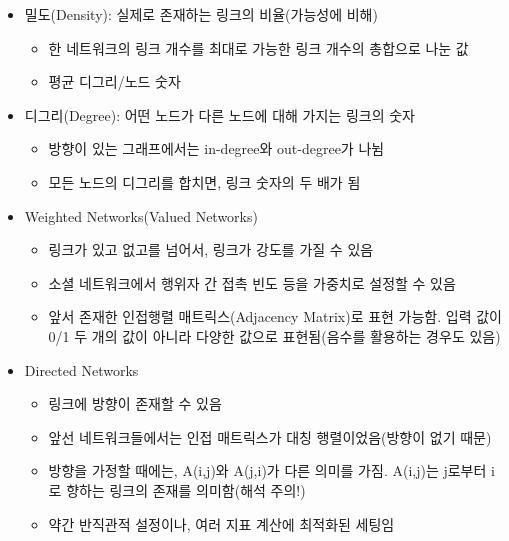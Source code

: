 \documentclass[
]{book}
\providecommand{\tightlist}{%
  \setlength{\itemsep}{0pt}\setlength{\parskip}{0pt}}
\begin{document}
\begin{itemize}
\tightlist
\item
  밀도(Density): 실제로 존재하는 링크의 비율(가능성에 비해)

  \begin{itemize}
  \tightlist
  \item
    한 네트워크의 링크 개수를 최대로 가능한 링크 개수의 총합으로 나눈 값
  \item
    평균 디그리/노드 숫자\\
  \end{itemize}
\item
  디그리(Degree): 어떤 노드가 다른 노드에 대해 가지는 링크의 숫자

  \begin{itemize}
  \tightlist
  \item
    방향이 있는 그래프에서는 in-degree와 out-degree가 나뉨\\
  \item
    모든 노드의 디그리를 합치면, 링크 숫자의 두 배가 됨\\
  \end{itemize}
\item
  Weighted Networks(Valued Networks)

  \begin{itemize}
  \tightlist
  \item
    링크가 있고 없고를 넘어서, 링크가 강도를 가질 수 있음\\
  \item
    소셜 네트워크에서 행위자 간 접촉 빈도 등을 가중치로 설정할 수 있음
  \item
    앞서 존재한 인접행렬 매트릭스(Adjacency Matrix)로 표현 가능함. 입력 값이 0/1 두 개의 값이 아니라 다양한 값으로 표현됨(음수를 활용하는 경우도 있음)\\
  \end{itemize}
\item
  Directed Networks

  \begin{itemize}
  \tightlist
  \item
    링크에 방향이 존재할 수 있음\\
  \item
    앞선 네트워크들에서는 인접 매트릭스가 대칭 행렬이었음(방향이 없기 때문)
  \item
    방향을 가정할 때에는, A(i,j)와 A(j,i)가 다른 의미를 가짐. A(i,j)는 j로부터 i로 향하는 링크의 존재를 의미함(해석 주의!)
  \item
    약간 반직관적 설정이나, 여러 지표 계산에 최적화된 세팅임
  \end{itemize}
\end{itemize}
\end{document}

